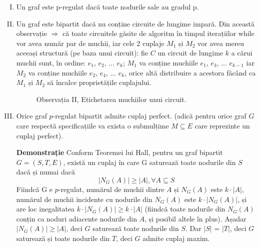 \documentclass[a4paper,12pt]{article}
\begin{document}
\begin{enumerate}[I.]
	\item Un graf este p-regulat dacă toate nodurile sale au gradul p.
	\item Un graf este bipartit dacă nu conține circuite de lungime impară. Din această observație $\Rightarrow$ că toate circuitele găsite de algoritm în timpul iterațiilor while vor avea număr par de muchii, iar cele 2 cuplaje $M_1$ și $M_2$ vor avea mereu aceeași structură (pe baza unui circuit): fie $C$ un circuit de lungime $k$ a cărui muchii sunt, în ordine: $e_1$, $e_2$, ... $e_k$; $M_1$ va conține muchiile $e_1$, $e_3$, ... $e_{k-1}$ iar $M_2$ va conține muchiile $e_2$, $e_4$, ... $e_k$, orice altă distribuire a acestora făcând ca $M_1$ și $M_2$ să încalce proprietățile cuplajului.
	
	\begin{figure}[h!]
	\centering
  	\caption{Observația II, Etichetarea muchiilor unui circuit.}
	\end{figure}

	
	\item Orice graf $p$-regulat bipartit admite cuplaj perfect. (adică pentru orice graf $G$ care respectă specificațiile va exista o submulțime $M \subseteq E$ care reprezinte un cuplaj perfect).
	
	\textbf{Demonstrație} Conform Teoremei lui Hall, pentru un graf bipartit $G=(S,T,E)$, există un cuplaj în care G saturează toate nodurile din $S$ dacă și numai dacă
	$$ |N_G(A)| \geq |A|, \forall A \subseteq S $$
	Fiindcă G e $p$-regulat, numărul de muchii dintre $A$ și $N_G(A)$ este $k \cdot |A|$, numărul de muchii incidente cu nodurile din $N_G(A)$ este $k \cdot |N_G(A)|$, și are loc inegalitatea $ k \cdot |N_G(A)| \geq k \cdot |A| $ (fiindcă toate nodurile din $N_G(A)$ conțin ca noduri adiacente nodurile din $A$, și posibil altele în plus). Așadar $|N_G(A)| \geq |A|$, deci $G$ saturează toate nodurile din $S$. Dar $|S|$ = $|T|$, deci $G$ saturează și toate nodurile din $T$, deci $G$ admite cuplaj maxim.
	
\end{enumerate}
\end{document}

